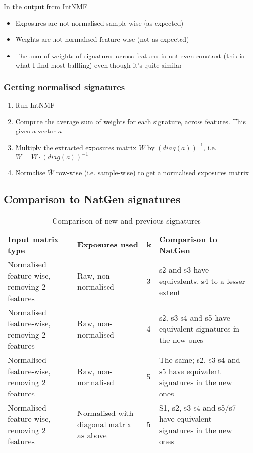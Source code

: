 \documentclass[11pt,a4paper,roman]{article}
\begin{document}
In the output from IntNMF
\begin{itemize}
\item Exposures are not normalised sample-wise (as expected)
\item Weights are not normalised feature-wise (not as expected)
\item The sum of weights of signatures across features is not even constant (this is what I find most baffling) even though it's quite similar
\end{itemize}

\subsubsection{Getting normalised signatures}
\begin{enumerate}
\item Run IntNMF
\item Compute the average sum of weights for each signature, across features. This gives a vector $a$
\item Multiply the extracted exposures matrix $W$ by $(diag(a))^{-1}$, i.e. $\bar{W}=W \cdot (diag(a))^{-1}$
\item Normalise $\bar{W}$ row-wise (i.e. sample-wise) to get a normalised exposures matrix
\end{enumerate}

\clearpage
\subsection{Comparison to NatGen signatures}
\begin{table}[h]
\begin{tabular}{L{2in}L{1.5in}lL{2in}}
\textbf{Input matrix type} & \textbf{Exposures used} & \textbf{k} & \textbf{Comparison to NatGen}\\
Normalised feature-wise, removing 2 features & Raw, non-normalised & 3 & s2 and s3 have equivalents. s4 to a lesser extent\\
Normalised feature-wise, removing 2 features & Raw, non-normalised & 4 & s2, s3 s4 and s5 have equivalent signatures in the new ones \\
Normalised feature-wise, removing 2 features & Raw, non-normalised & 5 & The same; s2, s3 s4 and s5 have equivalent signatures in the new ones\\
Normalised feature-wise, removing 2 features & Normalised with diagonal matrix as above & 5 & S1, s2, s3 s4 and s5/s7 have equivalent signatures in the new ones\\
\end{tabular}
\caption{Comparison of new and previous signatures}
\end{table}
\end{document}
